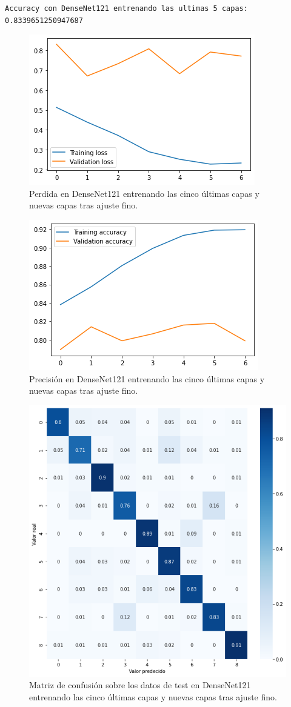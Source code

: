 \begin{lstlisting}
Accuracy con DenseNet121 entrenando las ultimas 5 capas: 0.8339651250947687
\end{lstlisting}



\begin{figure}[H]
  \centering
  \includegraphics[width=0.5\linewidth]{Imagenes/entrenamiento_redes/5-ult/densenet_5fine_loss.png}
  \caption{Perdida en DenseNet121 entrenando las cinco últimas capas y nuevas capas tras ajuste fino.}
\end{figure}

\begin{figure}[H]
  \centering
  \includegraphics[width=0.5\linewidth]{Imagenes/entrenamiento_redes/5-ult/densenet_5fine_acc.png}
  \caption{Precisión en DenseNet121 entrenando las cinco últimas capas y nuevas capas tras ajuste fino.}
\end{figure}

\begin{figure}[H]
  \centering
  \includegraphics[width=0.5\linewidth]{Imagenes/entrenamiento_redes/5-ult/densenet_5fine_matriz.png}
  \caption{Matriz de confusión sobre los datos de test en DenseNet121 entrenando las cinco últimas capas y nuevas capas tras ajuste fino.}
\end{figure}

